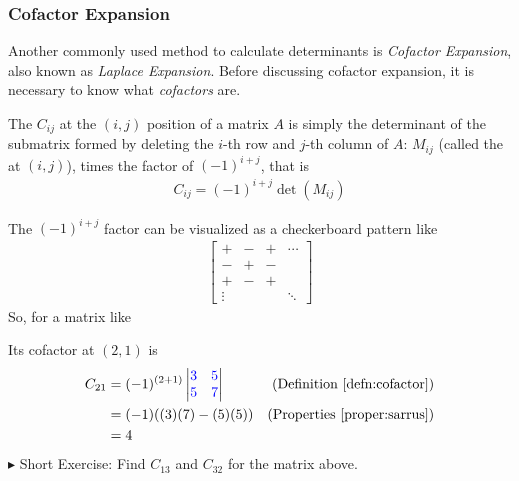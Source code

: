 \subsubsection{Cofactor Expansion}
Another commonly used method to calculate determinants is \textit{Cofactor Expansion}, also known as \textit{Laplace Expansion}. Before discussing cofactor expansion, it is necessary to know what \textit{cofactors} are.
\begin{defn}
\label{defn:cofactor}
The  $C_{ij}$ at the $(i, j)$ position of a matrix $A$ is simply the determinant of the submatrix formed by deleting the $i$-th row and $j$-th column of $A$: $M_{ij}$ (called the  at $(i, j)$), times the factor of $(-1)^{i+j}$, that is
\begin{align}
C_{ij} = (-1)^{i+j} \det(M_{ij})    
\end{align}
\end{defn}
The $(-1)^{i+j}$ factor can be visualized as a checkerboard pattern like
\begin{align*}
\begin{bmatrix}
+ & - & + & \cdots \\
- & + & - &  \\
+ & - & + &  \\
\vdots & &  & \ddots
\end{bmatrix}
\end{align*}
So, for a matrix like
\begin{center}
\end{center}
Its cofactor at $(2, 1)$ is
\begin{align*}
C_{21} &= (-1)^{(2+1)}
\begin{vmatrix}
\mathcolor{blue}{3} & \mathcolor{blue}{5} \\
\mathcolor{blue}{5} & \mathcolor{blue}{7}
\end{vmatrix} & \text{(Definition \ref{defn:cofactor})} \\
&= (-1)((3)(7) - (5)(5)) & \text{(Properties \ref{proper:sarrus})} \\
&= 4
\end{align*}
$\blacktriangleright$ Short Exercise: Find $C_{13}$ and $C_{32}$ for the matrix above.\footnotemark\par

